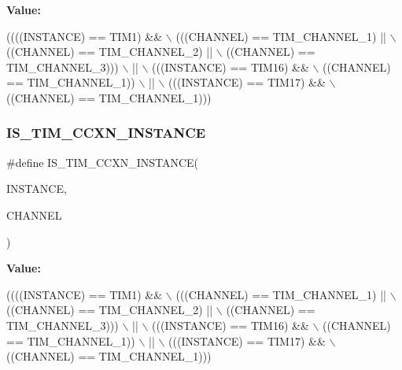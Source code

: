 {\bfseries Value\+:}
\begin{DoxyCode}
((((INSTANCE) == TIM1) &&                    \(\backslash\)
     (((CHANNEL) == TIM\_CHANNEL\_1) ||           \(\backslash\)
      ((CHANNEL) == TIM\_CHANNEL\_2) ||           \(\backslash\)
      ((CHANNEL) == TIM\_CHANNEL\_3)))            \(\backslash\)
    ||                                          \(\backslash\)
    (((INSTANCE) == TIM16) &&                   \(\backslash\)
     ((CHANNEL) == TIM\_CHANNEL\_1))              \(\backslash\)
    ||                                          \(\backslash\)
    (((INSTANCE) == TIM17) &&                   \(\backslash\)
     ((CHANNEL) == TIM\_CHANNEL\_1)))
\end{DoxyCode}
\mbox{\label{group___exported__macro_ga7181cfd1649c4e65e24b7c863e94a54f}} 
\subsubsection{\texorpdfstring{I\+S\+\_\+\+T\+I\+M\+\_\+\+C\+C\+X\+N\+\_\+\+I\+N\+S\+T\+A\+N\+CE}{IS\_TIM\_CCXN\_INSTANCE}\hspace{0.1cm}{\footnotesize\ttfamily [12/16]}}
{\footnotesize\ttfamily \#define I\+S\+\_\+\+T\+I\+M\+\_\+\+C\+C\+X\+N\+\_\+\+I\+N\+S\+T\+A\+N\+CE(\begin{DoxyParamCaption}\item[{}]{I\+N\+S\+T\+A\+N\+CE,  }\item[{}]{C\+H\+A\+N\+N\+EL }\end{DoxyParamCaption})}

{\bfseries Value\+:}
\begin{DoxyCode}
((((INSTANCE) == TIM1) &&                    \(\backslash\)
     (((CHANNEL) == TIM\_CHANNEL\_1) ||           \(\backslash\)
      ((CHANNEL) == TIM\_CHANNEL\_2) ||           \(\backslash\)
      ((CHANNEL) == TIM\_CHANNEL\_3)))            \(\backslash\)
    ||                                          \(\backslash\)
    (((INSTANCE) == TIM16) &&                   \(\backslash\)
     ((CHANNEL) == TIM\_CHANNEL\_1))              \(\backslash\)
    ||                                          \(\backslash\)
    (((INSTANCE) == TIM17) &&                   \(\backslash\)
     ((CHANNEL) == TIM\_CHANNEL\_1)))
\end{DoxyCode}
\mbox{\label{group___exported__macro_ga7181cfd1649c4e65e24b7c863e94a54f}} 
